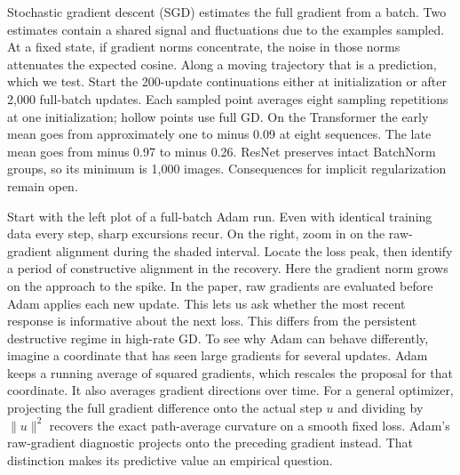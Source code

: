 {
}
{Stochastic gradient descent (SGD) estimates the full gradient from a batch. Two estimates contain a shared signal and fluctuations due to the examples sampled. At a fixed state, if gradient norms concentrate, the noise in those norms attenuates the expected cosine. Along a moving trajectory that is a prediction, which we test. Start the 200-update continuations either at initialization or after 2,000 full-batch updates. Each sampled point averages eight sampling repetitions at one initialization; hollow points use full GD. On the Transformer the early mean goes from approximately one to minus 0.09 at eight sequences. The late mean goes from minus 0.97 to minus 0.26. ResNet preserves intact BatchNorm groups, so its minimum is 1,000 images. Consequences for implicit regularization remain open.}

{
}
{Start with the left plot of a full-batch Adam run. Even with identical training data every step, sharp excursions recur. On the right, zoom in on the raw-gradient alignment during the shaded interval. Locate the loss peak, then identify a period of constructive alignment in the recovery. Here the gradient norm grows on the approach to the spike. In the paper, raw gradients are evaluated before Adam applies each new update. This lets us ask whether the most recent response is informative about the next loss. This differs from the persistent destructive regime in high-rate GD. To see why Adam can behave differently, imagine a coordinate that has seen large gradients for several updates. Adam keeps a running average of squared gradients, which rescales the proposal for that coordinate. It also averages gradient directions over time. For a general optimizer, projecting the full gradient difference onto the actual step \(u\) and dividing by \(\|u\|^2\) recovers the exact path-average curvature on a smooth fixed loss. Adam's raw-gradient diagnostic projects onto the preceding gradient instead. That distinction makes its predictive value an empirical question.}

